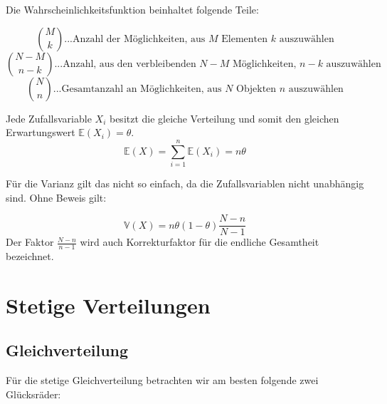 {    Die Wahrscheinlichkeitsfunktion beinhaltet folgende Teile:

    \[\binom{M}{k}...\text{Anzahl der Möglichkeiten, aus $M$ Elementen $k$ auszuwählen}\]
    \[\binom{N-M}{n-k}...\text{Anzahl, aus den verbleibenden $N-M$ Möglichkeiten, $n-k$ auszuwählen}\]
    \[\binom{N}{n}...\text{Gesamtanzahl an Möglichkeiten, aus $N$ Objekten $n$ auszuwählen}\]

    Jede Zufallsvariable $X_{i}$ besitzt die gleiche Verteilung und somit den gleichen Erwartungswert
    $\mathbb E\left(X_{i}\right)=\theta$.
    \[\mathbb{E}\left(X\right)=\sum_{i=1}^{n}{\mathbb E\left(X_{i}\right)}=n\theta\]

    Für die Varianz gilt das nicht so einfach, da die Zufallsvariablen nicht
    unabhängig sind. Ohne Beweis gilt:

    \[\mathbb V\left(X\right)=n\theta \left(1-\theta \right)\frac{N-n}{N-1}\]
    Der Faktor $\frac{N-n}{n-1}$ wird auch Korrekturfaktor für die endliche Gesamtheit bezeichnet.
    
    

    \section{Stetige Verteilungen}
    \label{sec:stetige_verteilungen}

    \subsection{Gleichverteilung}

    \begin{bsp}
    Für die stetige Gleichverteilung betrachten wir am besten folgende zwei
    Glücksräder:

    \begin{center}
    {
        \def\num{8}
        \def\size{1.5}
        }
\end{center}
\end{bsp}}
